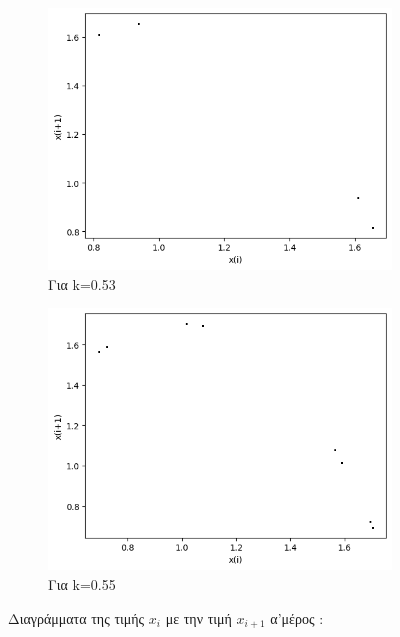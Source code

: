 \begin{figure}[h!]
\begin{subfigure}[b]{0.4\textwidth}
		\includegraphics[width=\textwidth]{LateX images/graphs q05/g5}
		\caption{Για k=0.53}
		\label{f:k29}
	\end{subfigure}
	\hfill
	\begin{subfigure}[b]{0.4\textwidth}
		\centering
		\includegraphics[width=\textwidth]{LateX images/graphs q05/g6}
		\caption{Για k=0.55}
		\label{f:k30}
	\end{subfigure}
	\hfill
	\caption{Διαγράμματα της τιμής \(x_i\) με την τιμή \(x_{i+1}\) α'μέρος :}
\end{figure}
